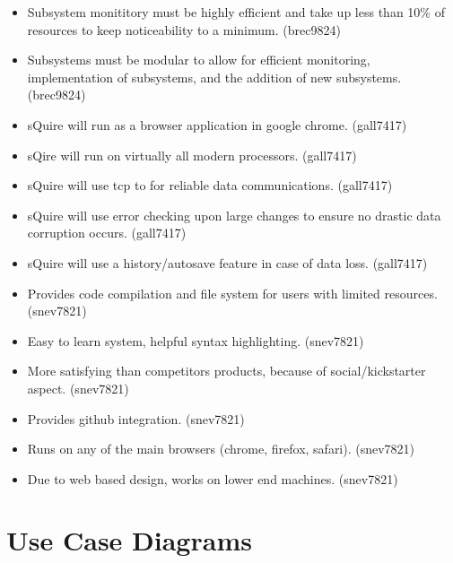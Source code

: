 \documentclass[11pt]{report}
\begin{document}
\begin{itemize}
            \item Subsystem monititory must be highly efficient and take up less than 10\% of resources to keep noticeability to a minimum. (brec9824)
            \item Subsystems must be modular to allow for efficient monitoring, implementation of subsystems, and the addition of new subsystems. (brec9824)
            \item sQuire will run as a browser application in google chrome. (gall7417)
            \item sQire will run on virtually all modern processors. (gall7417)
            \item sQuire will use tcp to for reliable data communications. (gall7417)
            \item sQuire will use error checking upon large changes to ensure no drastic data corruption occurs. (gall7417)
            \item sQuire will use a history/autosave feature in case of data loss. (gall7417)
            \item Provides code compilation and file system for users with limited resources. (snev7821)
            \item Easy to learn system, helpful syntax highlighting. (snev7821)
            \item More satisfying than competitors products, because of social/kickstarter aspect. (snev7821)
            \item Provides github integration. (snev7821)
            \item Runs on any of the main browsers (chrome, firefox, safari). (snev7821)
            \item Due to web based design, works on lower end machines. (snev7821)
    \end{itemize}


\section{Use Case Diagrams}
\end{document}
